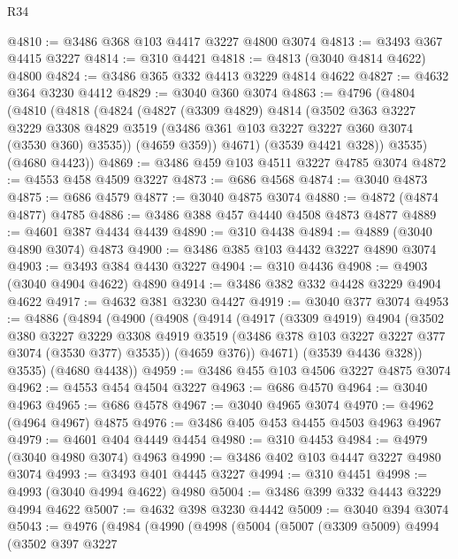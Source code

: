 \begin{lexlean}{R34}
\begin{coremodule}
@4810 := @3486 @368 @103 @4417 @3227 @4800 @3074
@4813 := @3493 @367 @4415 @3227
@4814 := @310 @4421
@4818 := @4813 (@3040 @4814 @4622) @4800
@4824 := @3486 @365 @332 @4413 @3229 @4814 @4622
@4827 := @4632 @364 @3230 @4412
@4829 := @3040 @360 @3074
@4863 := @4796
    (@4804
      (@4810
        (@4818
          (@4824
            (@4827
              (@3309 @4829)
              @4814
              (@3502
                @363
                @3227
                @3229
                @3308
                @4829
                @3519
                (@3486 @361 @103 @3227 @3227 @360 @3074 (@3530 @360) @3535))
              (@4659 @359))
            @4671)
          (@3539 @4421 @328))
        @3535)
      (@4680 @4423))
@4869 := @3486 @459 @103 @4511 @3227 @4785 @3074
@4872 := @4553 @458 @4509 @3227
@4873 := @686 @4568
@4874 := @3040 @4873
@4875 := @686 @4579
@4877 := @3040 @4875 @3074
@4880 := @4872 (@4874 @4877) @4785
@4886 := @3486 @388 @457 @4440 @4508 @4873 @4877
@4889 := @4601 @387 @4434 @4439
@4890 := @310 @4438
@4894 := @4889 (@3040 @4890 @3074) @4873
@4900 := @3486 @385 @103 @4432 @3227 @4890 @3074
@4903 := @3493 @384 @4430 @3227
@4904 := @310 @4436
@4908 := @4903 (@3040 @4904 @4622) @4890
@4914 := @3486 @382 @332 @4428 @3229 @4904 @4622
@4917 := @4632 @381 @3230 @4427
@4919 := @3040 @377 @3074
@4953 := @4886
    (@4894
      (@4900
        (@4908
          (@4914
            (@4917
              (@3309 @4919)
              @4904
              (@3502
                @380
                @3227
                @3229
                @3308
                @4919
                @3519
                (@3486 @378 @103 @3227 @3227 @377 @3074 (@3530 @377) @3535))
              (@4659 @376))
            @4671)
          (@3539 @4436 @328))
        @3535)
      (@4680 @4438))
@4959 := @3486 @455 @103 @4506 @3227 @4875 @3074
@4962 := @4553 @454 @4504 @3227
@4963 := @686 @4570
@4964 := @3040 @4963
@4965 := @686 @4578
@4967 := @3040 @4965 @3074
@4970 := @4962 (@4964 @4967) @4875
@4976 := @3486 @405 @453 @4455 @4503 @4963 @4967
@4979 := @4601 @404 @4449 @4454
@4980 := @310 @4453
@4984 := @4979 (@3040 @4980 @3074) @4963
@4990 := @3486 @402 @103 @4447 @3227 @4980 @3074
@4993 := @3493 @401 @4445 @3227
@4994 := @310 @4451
@4998 := @4993 (@3040 @4994 @4622) @4980
@5004 := @3486 @399 @332 @4443 @3229 @4994 @4622
@5007 := @4632 @398 @3230 @4442
@5009 := @3040 @394 @3074
@5043 := @4976
    (@4984
      (@4990
        (@4998
          (@5004
            (@5007
              (@3309 @5009)
              @4994
              (@3502
                @397
                @3227

\end{coremodule}
\end{lexlean}
